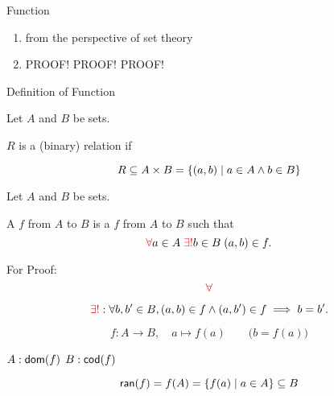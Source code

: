 \begin{frame}{}
  \begin{center}
    {\LARGE Function}


    \begin{enumerate}[(1)]
      \centering
      \item<2-> from the perspective of set theory
      \item<3-> PROOF! PROOF! PROOF!
    \end{enumerate}
  \end{center}
\end{frame}

\begin{frame}{}
  \begin{center}
    {\LARGE Definition of Function}
  \end{center}
\end{frame}

\begin{frame}{}
  \begin{definition}[Relation]
    Let $A$ and $B$ be sets.

    $R$ is a (binary) relation if

    \[
      R \subseteq A \times B = \{(a, b) \mid a \in A \land b \in B\}
    \]
  \end{definition}
\end{frame}

\begin{frame}{}
  \begin{definition}[Function]
    Let $A$ and $B$ be sets.

    A  $f$ from $A$ to $B$ is a  $f$ from $A$ to $B$ such that
    \[
      \textcolor{red}{\forall} a \in A\; \textcolor{red}{\exists!} b \in B\; (a, b) \in f.
    \]
  \end{definition}

  \pause
  \begin{alertblock}{For Proof:}
    \[
      \textcolor{red}{\forall}
    \]

    \[
      \textcolor{red}{\exists!}: \forall b, b' \in B, (a, b) \in f \land (a, b') \in f \implies b = b'.
    \]
  \end{alertblock}

  \pause
  \[
    f: A \to B, \quad a \mapsto f(a) \qquad\Big(b = f(a)\Big)
  \]

  \centerline{$A: \textsf{dom}(f)$ \qquad $B: \textsf{cod}(f)$}

  \pause
  \[
    \textsf{ran}(f) = f(A) = \{f(a) \mid a \in A\} \subseteq B
  \]
\end{frame}

